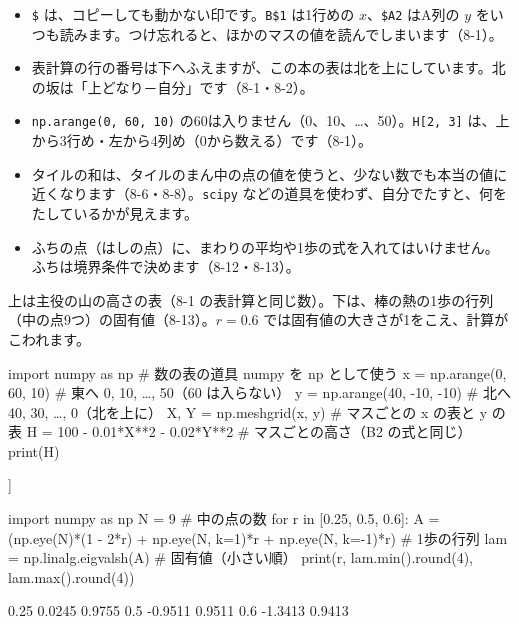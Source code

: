 \begin{itemize}[leftmargin=1.4\zw, itemsep=2pt, topsep=4pt, label={\color{\bkTT}●}]
\item \texttt{\$} は、コピーしても動かない印です。\texttt{B\$1} は1行めの $x$、\texttt{\$A2} はA列の $y$ をいつも読みます。つけ忘れると、ほかのマスの値を読んでしまいます（8-1）。
\item 表計算の行の番号は下へふえますが、この本の表は北を上にしています。北の坂は「上どなり－自分」です（8-1・8-2）。
\item \texttt{np.arange(0, 60, 10)} の60は入りません（0、10、…、50）。\texttt{H[2, 3]} は、上から3行め・左から4列め（0から数える）です（8-1）。
\item タイルの和は、タイルのまん中の点の値を使うと、少ない数でも本当の値に近くなります（8-6・8-8）。\texttt{scipy} などの道具を使わず、自分でたすと、何をたしているかが見えます。
\item ふちの点（はしの点）に、まわりの平均や1歩の式を入れてはいけません。ふちは境界条件で決めます（8-12・8-13）。
\end{itemize}

{\small 上は主役の山の高さの表（8-1 の表計算と同じ数）。下は、棒の熱の1歩の行列（中の点9つ）の固有値（8-13）。$r=0.6$ では固有値の大きさが1をこえ、計算がこわれます。}\par\vspace{1mm}
\begin{bkcode}[Python]
import numpy as np               \# 数の表の道具 numpy を np として使う
x = np.arange(0, 60, 10)         \# 東へ 0, 10, …, 50（60 は入らない）
y = np.arange(40, -10, -10)      \# 北へ 40, 30, …, 0（北を上に）
X, Y = np.meshgrid(x, y)         \# マスごとの x の表と y の表
H = 100 - 0.01*X**2 - 0.02*Y**2  \# マスごとの高さ（B2 の式と同じ）
print(H)
\end{bkcode}
\begin{bkcodeout}[実行結果]
[[ 68.  67.  64.  59.  52.  43.]
 [ 82.  81.  78.  73.  66.  57.]
 [ 92.  91.  88.  83.  76.  67.]
 [ 98.  97.  94.  89.  82.  73.]
 [100.  99.  96.  91.  84.  75.]]
\end{bkcodeout}
\vspace{1mm}
\Needspace{66mm}
\begin{bkcode}[Python]
import numpy as np
N = 9                                \# 中の点の数
for r in [0.25, 0.5, 0.6]:
    A = (np.eye(N)*(1 - 2*r) + np.eye(N, k=1)*r
         + np.eye(N, k=-1)*r)        \# 1歩の行列
    lam = np.linalg.eigvalsh(A)      \# 固有値（小さい順）
    print(r, lam.min().round(4), lam.max().round(4))
\end{bkcode}
\begin{bkcodeout}[実行結果]
0.25 0.0245 0.9755
0.5 -0.9511 0.9511
0.6 -1.3413 0.9413
\end{bkcodeout}
\vspace{2mm}

